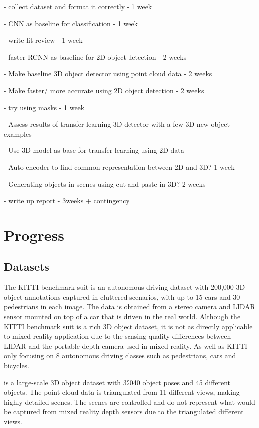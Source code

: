 \documentclass[11pt]{article}
\begin{document}
- collect dataset and format it correctly  -  1 week

- CNN as baseline for classification  -  1 week

- write lit review - 1 week

- faster-RCNN as baseline for 2D object detection   -   2 weeks

- Make baseline 3D object detector using point cloud data   -  2 weeks

- Make faster/ more accurate using 2D object detection  -  2 weeks

- try using masks  - 1 week

- Assess results of transfer learning 3D detector with a few 3D new object examples

- Use 3D model as base for transfer learning using 2D data

- Auto-encoder to find common representation between 2D and 3D?  1 week

- Generating objects in scenes using cut and paste in 3D?  2 weeks

- write up report - 3weeks + contingency



\section{Progress}
\subsection*{Datasets}
The KITTI benchmark suit \cite{KITTI} is an autonomous driving dataset with 200,000 3D object annotations captured in cluttered scenarios, with up to 15 cars and 30 pedestrians in each image. The data is obtained from a stereo camera and LIDAR sensor mounted on top of a car that is driven in the real world. Although the KITTI benchmark suit is a rich 3D object dataset, it is not as directly applicable to mixed reality application due to the sensing quality differences between LIDAR and the portable depth camera used in mixed reality. As well as KITTI only focusing on 8 autonomous driving classes such as pedestrians, cars and bicycles. 

\cite{3D_dataset} is a large-scale 3D object dataset with 32040 object poses and 45 different objects. The point cloud data is triangulated from 11 different views, making highly detailed scenes. The scenes are controlled and do not represent what would be captured from mixed reality depth sensors due to the triangulated different views.
\end{document}
